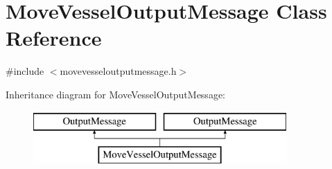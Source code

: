 \hypertarget{class_move_vessel_output_message}{}\section{Move\+Vessel\+Output\+Message Class Reference}
\label{class_move_vessel_output_message}


{\ttfamily \#include $<$movevesseloutputmessage.\+h$>$}

Inheritance diagram for Move\+Vessel\+Output\+Message\+:\begin{figure}[H]
\begin{center}
\leavevmode
\includegraphics[height=2.000000cm]{d0/db3/class_move_vessel_output_message}
\end{center}
\end{figure}
